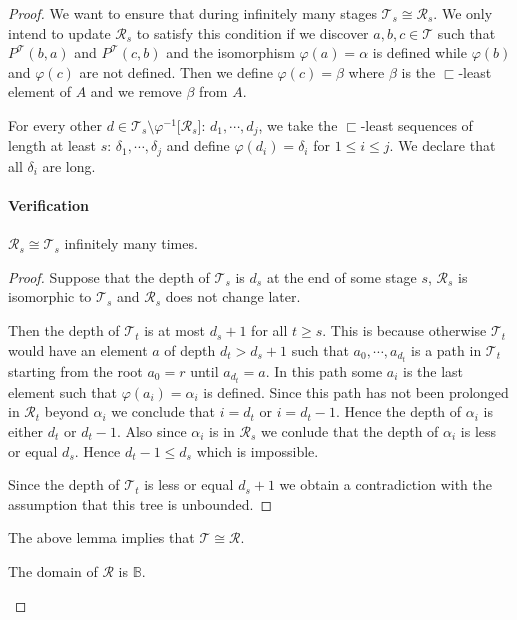\documentclass[a4paper,UKenglish,cleveref, autoref, thm-restate]{lipics-v2021}
\begin{document}
\begin{proof}
    We want to ensure that during infinitely many stages $\mathcal{T}_s \cong \mathcal{R}_s$. We only intend to update $\mathcal{R}_s$ to satisfy this condition if we discover $a,b,c \in \mathcal{T}$ such that $P^{\mathcal{T}}(b,a)$ and $P^{\mathcal{T}}(c,b)$ and the isomorphism $\varphi(a)=\alpha$ is defined while $\varphi(b)$ and $\varphi(c)$ are not defined. Then we define $\varphi(c)=\beta$ where $\beta$ is the $\sqsubset$-least element of $A$ and we remove $\beta$ from $A$.
   


    For every other $d \in \mathcal{T}_s \setminus \varphi^{-1} \lbrack \mathcal{R}_s \rbrack$: $d_1,\cdots,d_j$, we take the $\sqsubset$-least sequences of length at least $s$: $\delta_1,\cdots,\delta_j$ and define $\varphi(d_i)=\delta_i$ for $1 \leq i \leq j$. We declare that all $\delta_i$ are long.

    \paragraph*{Verification}
    \begin{lemma}
    \label{LemmaCong}
        $\mathcal{R}_s \cong \mathcal{T}_s$ infinitely many times.  
    \end{lemma}

    \begin{proof}
      Suppose that the depth of $\mathcal{T}_s$ is $d_s$ at the end of some stage $s$, $\mathcal{R}_s$ is isomorphic to $\mathcal{T}_s$ and $\mathcal{R}_s$ does not change later. 
      
      Then the depth of $\mathcal{T}_t$ is at most $d_s+1$ for all $t \geq s$. This is because otherwise $\mathcal{T}_t$ would have an element $a$ of depth $d_t>d_s+1$ such that $a_0,\cdots,a_{d_t}$ is a path in $\mathcal{T}_t$ starting from the root  $a_0=r$ until $a_{d_t}=a$. In this path some $a_i$ is the last element such that $\varphi(a_i)=\alpha_i$ is defined. Since this path has not been prolonged in $\mathcal{R}_t$ beyond $\alpha_i$ we conclude that $i=d_t$ or $i=d_t-1$. Hence the depth of $\alpha_i$ is either $d_t$ or $d_t-1$. Also since $\alpha_i$ is in $\mathcal{R}_s$ we conlude that the depth of $\alpha_i$ is less or equal $d_s$. Hence $d_t-1 \leq d_s$ which is impossible.

      Since the depth of $\mathcal{T}_t$ is less or equal $d_s+1$ we obtain a contradiction with the assumption that this tree is unbounded.
    \end{proof}
The above lemma implies that $\mathcal{T} \cong \mathcal{R}$.
    \begin{lemma}
        The domain of $\mathcal{R}$ is $\mathbb{B}$.
    \end{lemma}


\end{proof}
\end{document}

